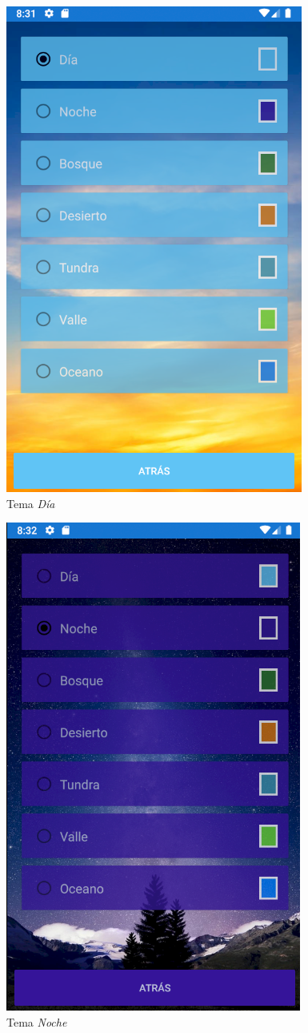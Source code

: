 \begin{figure}[H]
    \centering
    \includegraphics[scale=0.3]{Figures/Capturas/TemaDia.png}
    \caption{Tema \textit{Día}}
    \label{Noche}    
\end{figure}
\begin{figure}[H]
    \centering
    \includegraphics[scale=0.3]{Figures/Capturas/TemaNoche.png}
    \caption{Tema \textit{Noche}}
    \label{Dia}    
\end{figure}
